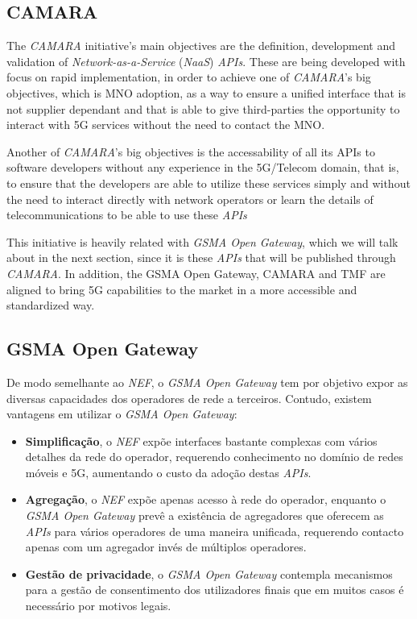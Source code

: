 \subsection{CAMARA}

The \emph{CAMARA} initiative's main objectives are the
definition, development and validation of
\emph{Network-as-a-Service} (\emph{NaaS}) \emph{APIs}. These are
being developed with focus on rapid implementation, in order to
achieve one of \emph{CAMARA}'s big objectives, which is MNO
adoption, as a way to ensure a unified interface that is not
supplier dependant and that is able to give third-parties the
opportunity to interact with 5G services without the need to
contact the MNO.

Another of \emph{CAMARA}'s big objectives is the accessability of
all its APIs to software developers without any experience in the
5G/Telecom domain, that is, to ensure that the developers are able to
utilize these services simply and without the need to interact
directly with network operators or learn the details of
telecommunications to be able to use these \emph{APIs} 

This initiative is heavily related with \emph{GSMA Open Gateway},
which we will talk about in the next section, since it is these
\emph{APIs} that will be published through \emph{CAMARA}.
In addition, the GSMA Open Gateway, CAMARA and TMF are aligned
to bring 5G capabilities to the market in a more accessible and standardized way.


\subsection{GSMA Open Gateway}

De modo semelhante ao \emph{NEF}, o \emph{GSMA Open Gateway} tem por objetivo
expor as diversas capacidades dos operadores de rede a terceiros.
Contudo, existem vantagens em utilizar o \emph{GSMA Open Gateway}:

\begin{itemize}
	\item \textbf{Simplificação}, o \emph{NEF} expõe interfaces bastante
	      complexas com vários detalhes da rede do operador, requerendo
	      conhecimento no domínio de redes móveis e 5G, aumentando o custo da
	      adoção destas \emph{APIs}.
	\item \textbf{Agregação}, o \emph{NEF} expõe apenas acesso à rede do
	      operador, enquanto o \emph{GSMA Open Gateway} prevê a existência de
	      agregadores que oferecem as \emph{APIs} para vários operadores de uma
	      maneira unificada, requerendo contacto apenas com um agregador invés de
	      múltiplos operadores.
	\item \textbf{Gestão de privacidade}, o \emph{GSMA Open Gateway}
	      contempla mecanismos para a gestão de consentimento dos utilizadores
	      finais que em muitos casos é necessário por motivos legais.
\end{itemize}

